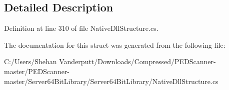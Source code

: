 \subsection{Detailed Description}


Definition at line 310 of file Native\+Dll\+Structure.\+cs.



The documentation for this struct was generated from the following file\+:\begin{DoxyCompactItemize}
\item 
C\+:/\+Users/\+Shehan Vanderputt/\+Downloads/\+Compressed/\+P\+E\+D\+Scanner-\/master/\+P\+E\+D\+Scanner-\/master/\+Server64\+Bit\+Library/\+Server64\+Bit\+Library/Native\+Dll\+Structure.\+cs\end{DoxyCompactItemize}
